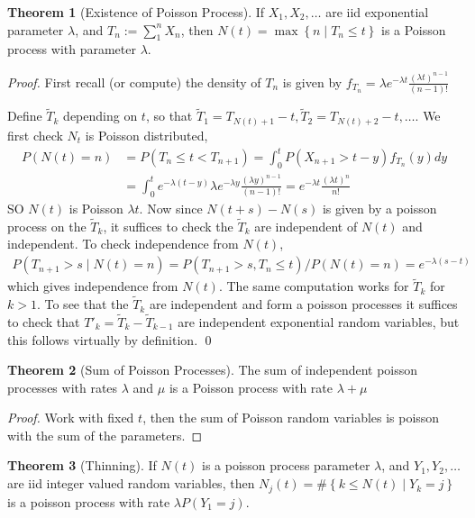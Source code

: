 \documentclass{article}
\theoremstyle{definition}
\newtheorem{theorem}{Theorem}
\newcommand{\set}[1]{\left\{#1\right\}}
\begin{document}
    \begin{theorem}[Existence of Poisson Process]
        If \(X_1,X_2,\hdots\) are iid exponential parameter \(\lambda\), and \(T_n := \sum_1^n X_n\), then \(N(t) = \max\set{n \mid T_n \leq t}\) is a Poisson process with parameter \(\lambda\).
    \end{theorem}
    \begin{proof}
        First recall (or compute) the density of \(T_n\) is given by \(f_{T_n} = \lambda e^{-\lambda t}\frac{(\lambda t)^{n-1}}{(n-1)!}\)

        Define \(\tilde{T}_k\) depending on \(t\), so that \(\tilde{T}_1 = T_{N(t) + 1} - t, \tilde{T}_2 = T_{N(t)+2} - t,\hdots\). We first check \(N_t\) is Poisson distributed,
        \begin{align*}
            P(N(t) = n) &= P(T_{n} \leq t < T_{n+1}) = \int_0^t P(X_{n+1}>t-y)f_{T_n}(y)dy \\
            &= \int_0^t e^{-\lambda(t-y)}\lambda e^{-\lambda y}\frac{(\lambda y)^{n-1}}{(n-1)!} = e^{-\lambda t}\frac{(\lambda t)^{n}}{n!}
        \end{align*}
        SO \(N(t)\) is Poisson \(\lambda t\). Now since \(N(t+s) - N(s)\) is given by a poisson process on the \(\tilde{T}_k\), it suffices to check the \(\tilde{T}_k\) are independent of \(N(t)\) and independent. To check independence from \(N(t)\),
        \begin{align*}
            P(T_{n+1} > s \mid N(t) = n) = P(T_{n+1} > s, T_n \leq t)/P(N(t)=n) = e^{-\lambda(s-t)}
        \end{align*}
        which gives independence from \(N(t)\). The same computation works for \(\tilde{T}_k\) for \(k > 1\). To see that the \(\tilde{T}_k\) are independent and form a poisson processes it suffices to check that \(T'_k = \tilde{T}_k - \tilde{T}_{k-1}\) are independent exponential random variables, but this follows virtually by definition. \qed
    \end{proof}
    \begin{theorem}[Sum of Poisson Processes]
        The sum of independent poisson processes with rates \(\lambda\) and \(\mu\) is a Poisson process with rate \(\lambda + \mu\)
    \end{theorem}
    \begin{proof}
        Work with fixed \(t\), then the sum of Poisson random variables is poisson with the sum of the parameters.
    \end{proof}
    \begin{theorem}[Thinning]
        If \(N(t)\) is a poisson process parameter \(\lambda\), and \(Y_1,Y_2,\hdots\) are iid integer valued random variables, then \(N_j(t) = \#\set{k \leq N(t)\mid Y_k=j}\) is a poisson process with rate \(\lambda P(Y_1 = j)\).
    \end{theorem}
\end{document}
